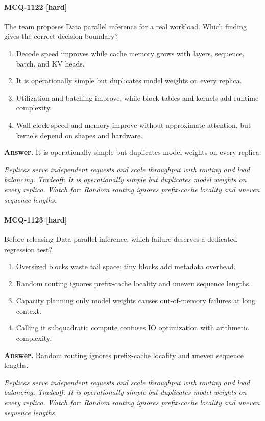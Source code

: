 \paragraph{MCQ-1122 [hard]} The team proposes Data parallel inference for a real workload. Which finding gives the correct decision boundary?
\begin{enumerate}[label=\Alph*.]
\item Decode speed improves while cache memory grows with layers, sequence, batch, and KV heads.
\item It is operationally simple but duplicates model weights on every replica.
\item Utilization and batching improve, while block tables and kernels add runtime complexity.
\item Wall-clock speed and memory improve without approximate attention, but kernels depend on shapes and hardware.
\end{enumerate}
\noindent\textbf{Answer.} It is operationally simple but duplicates model weights on every replica.
\par\textit{Replicas serve independent requests and scale throughput with routing and load balancing. Tradeoff: It is operationally simple but duplicates model weights on every replica. Watch for: Random routing ignores prefix-cache locality and uneven sequence lengths.}
\paragraph{MCQ-1123 [hard]} Before releasing Data parallel inference, which failure deserves a dedicated regression test?
\begin{enumerate}[label=\Alph*.]
\item Oversized blocks waste tail space; tiny blocks add metadata overhead.
\item Random routing ignores prefix-cache locality and uneven sequence lengths.
\item Capacity planning only model weights causes out-of-memory failures at long context.
\item Calling it subquadratic compute confuses IO optimization with arithmetic complexity.
\end{enumerate}
\noindent\textbf{Answer.} Random routing ignores prefix-cache locality and uneven sequence lengths.
\par\textit{Replicas serve independent requests and scale throughput with routing and load balancing. Tradeoff: It is operationally simple but duplicates model weights on every replica. Watch for: Random routing ignores prefix-cache locality and uneven sequence lengths.}
